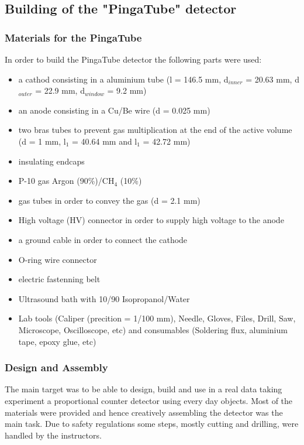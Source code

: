 \subsection{Building of the "PingaTube" detector}
\label{sec:building_pingatube}

\subsubsection{Materials for the PingaTube}
\label{sec:materials_pingatube}
In order to build the PingaTube detector the following parts were used:
\begin{itemize}
\item a cathod consisting in a aluminium tube (l = 146.5 mm, d$_{inner}$ = 20.63
  mm, d$_{outer}$ = 22.9 mm, d$_{window}$ = 9.2 mm)
\item an anode consisting in a Cu/Be wire (d = 0.025 mm)
\item two bras tubes to prevent gas multiplication at the end of the active
  volume (d = 1 mm, l$_{1}$ = 40.64 mm and l$_{1}$ = 42.72 mm)
\item insulating endcaps
\item P-10 gas Argon (90\%)/CH$_{4}$ (10\%)
\item gas tubes in order to convey the gas (d = 2.1 mm)
\item High voltage (HV) connector in order to supply high voltage to the anode
\item a ground cable in order to connect the cathode
\item O-ring wire connector
\item electric fastenning belt
\item Ultrasound bath with 10/90 Isopropanol/Water
\item Lab tools (Caliper (precition = 1/100 mm), Needle, Gloves, Files, Drill,
  Saw, Microscope, Oscilloscope, etc) and consumables (Soldering flux, aluminium
  tape, epoxy glue, etc)
\end{itemize}

\subsubsection{Design and Assembly}
\label{sec:design_and_assembly_beercan}
The main target was to be able to design, build and use in a real data taking
experiment a proportional counter detector using every day objects. Most of the
materials were provided and hence creatively assembling the detector was the
main task. Due to safety regulations some steps, mostly cutting and drilling,
were handled by the instructors.

